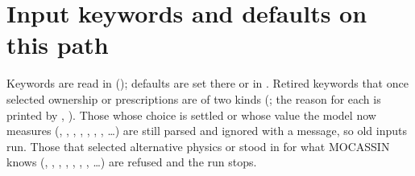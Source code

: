\section{Input keywords and defaults on this path}
\label{app:keywords}

Keywords are read in  (); defaults are
set there or in . Retired keywords that once selected
ownership or prescriptions are of two kinds (;
the reason for each is printed by , ).
Those whose choice is settled or whose value the model now measures
(, , , ,
, , , \ldots) are still parsed
and ignored with a message, so old inputs run. Those that selected alternative
physics or stood in for what MOCASSIN knows (,
, , , ,
, , \ldots) are refused and the run stops.

